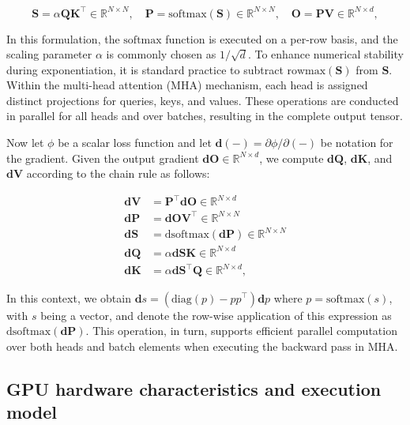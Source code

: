 \begin{equation*}
  \mathbf{S} = \alpha \mathbf{Q} \mathbf{K}^\top \in \mathbb{R}^{N \times N}, \quad \mathbf{P} = \mathrm{softmax}(\mathbf{S}) \in \mathbb{R}^{N \times N}, \quad \mathbf{O} = \mathbf{P}\mathbf{V} \in \mathbb{R}^{N \times d},
\end{equation*}

In this formulation, the $\mathrm{softmax}$ function is executed on a per-row basis, and the scaling parameter $\alpha$ is commonly chosen as $1/\sqrt{d}$. To enhance numerical stability during exponentiation, it is standard practice to subtract $\mathrm{rowmax}(\mathbf{S})$ from $\mathbf{S}$. Within the multi-head attention (MHA) mechanism, each head is assigned distinct projections for queries, keys, and values. These operations are conducted in parallel for all heads and over batches, resulting in the complete output tensor.

Now let $\phi$ be a scalar loss function and let $\mathbf{d}(-) = \partial \phi / \partial (-)$ be notation for the gradient. Given the output gradient $\mathbf{dO} \in \mathbb{R}^{N \times d}$, we compute $\mathbf{dQ}$, $\mathbf{dK}$, and $\mathbf{dV}$ according to the chain rule as follows:

\begin{align*}
  \mathbf{dV} &= \mathbf{P}^\top \mathbf{dO} \in \mathbb{R}^{N \times d} \\
  \mathbf{dP} &= \mathbf{dO} \mathbf{V}^\top \in \mathbb{R}^{N \times N} \\
  \mathbf{dS} &= \mathrm{dsoftmax} (\mathbf{dP}) \in \mathbb{R}^{N \times N} \\
  \mathbf{dQ} &= \alpha \mathbf{dS} \mathbf{K} \in \mathbb{R}^{N \times d} \\
  \mathbf{dK} &= \alpha \mathbf{dS}^\top \mathbf{Q} \in \mathbb{R}^{N \times d},
\end{align*}

In this context, we obtain $\mathbf{d}s = (\mathrm{diag}(p) - p p^\top)\mathbf{d}p$ where $p = \mathrm{softmax}(s)$, with $s$ being a vector, and denote the row-wise application of this expression as $\mathrm{dsoftmax}(\mathbf{dP})$. This operation, in turn, supports efficient parallel computation over both heads and batch elements when executing the backward pass in MHA.

\subsection{GPU hardware characteristics and execution model}
\label{subsec:hardware}

